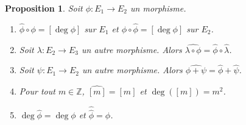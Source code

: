 \documentclass{article}
\theoremstyle{plain}%
\newtheorem{prop}[thm]{Proposition}
\theoremstyle{definition}%
\newcommand{\Z}{\mathbb{Z}}
\newcommand{\h}{\widehat}
\begin{document}
\begin{prop}
  \label{propriétés_duale}
  Soit $\phi : E_1 \to E_2$ un morphisme.  
  \begin{enumerate}
    \item $\h\phi\circ\phi = [\deg{\phi}]$ sur $E_1$ et $\phi\circ\h\phi = [\deg{\phi}]$ sur $E_2$.
    \item Soit $\lambda :E_2\to E_3$ un autre morphisme. Alors $\h{\lambda\circ\phi} = \h\phi\circ\h\lambda$.
    \item Soit $\psi :E_1\to E_2$ un autre morphisme. Alors $\h{\phi+\psi} = \h\phi + \h\psi$.
    \item Pour tout $m\in\Z$, $\h{[m]} = [m]$ et $\deg([m]) = m^2$.
    \item $\deg\h\phi = \deg\phi$ et $\h{\h\phi} = \phi$.
  \end{enumerate}
\end{prop}
\end{document}
